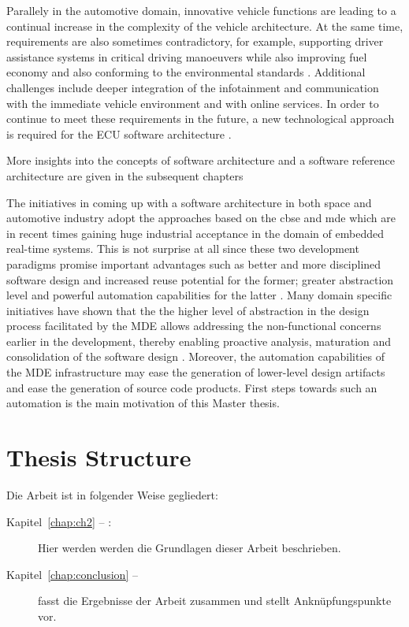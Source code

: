 Parallely in the automotive domain, innovative vehicle functions are leading to a continual increase in the complexity of the vehicle architecture. At the same time, requirements are also sometimes contradictory, for example, supporting driver assistance systems in critical driving manoeuvers while also improving fuel economy and also conforming to the environmental standards \cite{AUTOSARurl}. Additional challenges include deeper integration of the infotainment and communication with the immediate vehicle environment and with online services. In order to continue to meet these requirements in the future, a new technological approach is required for the ECU software architecture \cite{AUTOSARurl}.  

More insights into the concepts of software architecture and a software reference architecture are given in the subsequent chapters     

The initiatives in coming up with a software architecture in both space and automotive industry adopt the approaches based on the \ac{cbse} and \ac{mde} which are in recent times gaining huge industrial acceptance in the domain of embedded real-time systems. This is not surprise at all since these two development paradigms promise important advantages such as better and more disciplined software design and increased reuse potential for the former; greater abstraction level and powerful automation capabilities for the latter \cite{CBSE}\cite{PhdThesis}. Many domain specific initiatives have shown that the the higher level of abstraction in the design process facilitated by the MDE allows addressing the non-functional concerns earlier in the development, thereby enabling proactive analysis, maturation and consolidation of the software design \cite{CompBasedDev}. Moreover, the automation capabilities of the MDE infrastructure may ease the generation of lower-level design artifacts and ease the generation of source code products.
First steps towards such an automation is the main motivation of this Master thesis.

\section*{Thesis Structure}
Die Arbeit ist in folgender Weise gegliedert:
\begin{description}
\item[Kapitel~\ref{chap:ch2} -- :] Hier werden werden die Grundlagen dieser Arbeit beschrieben.
\item[Kapitel~\ref{chap:conclusion} -- ] fasst die Ergebnisse der Arbeit zusammen und stellt Anknüpfungspunkte vor.
\end{description}
